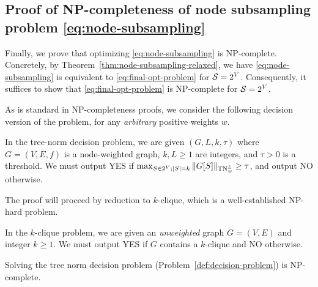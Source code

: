 \subsection{Proof of NP-completeness of node subsampling problem \eqref{eq:node-subsampling}} \label{sec:hardness}

Finally, we prove that optimizing \eqref{eq:node-subsampling} is NP-complete. Concretely, by Theorem~\ref{thm:node-subsampling-relaxed}, we have \eqref{eq:node-subsampling} is equivalent to \eqref{eq:final-opt-problem} for $\mathcal S = 2^V$. Consequently, it suffices to show that \eqref{eq:final-opt-problem} is NP-complete for $\mathcal S = 2^V$.

As is standard in NP-completeness proofs, we consider the following decision version of the problem, for any \emph{arbitrary} positive weights $w$. 

\begin{definition}\label{def:decision-problem} In the tree-norm decision problem, we are given $(G, L, k, \tau)$ where $G = (V, E, f)$ is a node-weighted graph, $k, L \geq 1$ are integers, and $\tau > 0$ is a threshold. We must output YES if $\max_{S \in 2^V; \left\lvert S\right\rvert = k} \Vert G[S] \Vert_{\textnormal{TN}_w^L} \geq \tau$, and output NO otherwise. 
\end{definition}

The proof will proceed by reduction to $k$-clique, which is a well-established NP-hard problem. 
\begin{definition}\label{def:k-clique} In the $k$-clique problem, we are given an \emph{unweighted} graph $G = (V, E)$ and integer $k \geq 1$. We must output YES if $G$ contains a $k$-clique and NO otherwise. 
\end{definition}

\begin{theorem}\label{thm:np-hard} Solving the tree norm decision problem (Problem~\ref{def:decision-problem}) is NP-complete. 
\end{theorem} 

